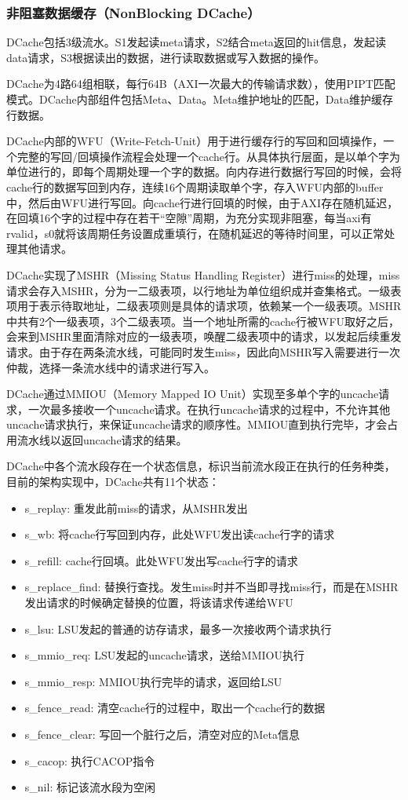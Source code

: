 \documentclass{article}
\begin{document}
\subsubsection{非阻塞数据缓存（NonBlocking DCache）}
DCache包括3级流水。S1发起读meta请求，S2结合meta返回的hit信息，发起读data请求，S3根据读出的数据，进行读取数据或写入数据的操作。\par
DCache为4路64组相联，每行64B（AXI一次最大的传输请求数），使用PIPT匹配模式。DCache内部组件包括Meta、Data。Meta维护地址的匹配，Data维护缓存行数据。\par
DCache内部的WFU（Write-Fetch-Unit）用于进行缓存行的写回和回填操作，一个完整的写回/回填操作流程会处理一个cache行。从具体执行层面，是以单个字为单位进行的，即每个周期处理一个字的数据。向内存进行数据行写回的时候，会将cache行的数据写回到内存，连续16个周期读取单个字，存入WFU内部的buffer中，然后由WFU进行写回。向cache行进行回填的时候，由于AXI存在随机延迟，在回填16个字的过程中存在若干“空隙”周期，为充分实现非阻塞，每当axi有rvalid，s0就将该周期任务设置成重填行，在随机延迟的等待时间里，可以正常处理其他请求。\par
DCache实现了MSHR（Missing Status Handling Register）进行miss的处理，miss请求会存入MSHR，分为一二级表项，以行地址为单位组织成并查集格式。一级表项用于表示待取地址，二级表项则是具体的请求项，依赖某一个一级表项。MSHR中共有2个一级表项，3个二级表项。当一个地址所需的cache行被WFU取好之后，会来到MSHR里面清除对应的一级表项，唤醒二级表项中的请求，以发起后续重发请求。由于存在两条流水线，可能同时发生miss，因此向MSHR写入需要进行一次仲裁，选择一条流水线中的请求进行写入。\par
DCache通过MMIOU（Memory Mapped IO Unit）实现至多单个字的uncache请求，一次最多接收一个uncache请求。在执行uncache请求的过程中，不允许其他uncache请求执行，来保证uncache请求的顺序性。MMIOU直到执行完毕，才会占用流水线以返回uncache请求的结果。\par
DCache中各个流水段存在一个状态信息，标识当前流水段正在执行的任务种类，目前的架构实现中，DCache共有11个状态：\par
\begin{itemize}
    \item s\_replay: 重发此前miss的请求，从MSHR发出
    \item s\_wb: 将cache行写回到内存，此处WFU发出读cache行字的请求
    \item s\_refill: cache行回填。此处WFU发出写cache行字的请求
    \item s\_replace\_find: 替换行查找。发生miss时并不当即寻找miss行，而是在MSHR发出请求的时候确定替换的位置，将该请求传递给WFU
    \item s\_lsu: LSU发起的普通的访存请求，最多一次接收两个请求执行
    \item s\_mmio\_req: LSU发起的uncache请求，送给MMIOU执行
    \item s\_mmio\_resp: MMIOU执行完毕的请求，返回给LSU
    \item s\_fence\_read: 清空cache行的过程中，取出一个cache行的数据
    \item s\_fence\_clear: 写回一个脏行之后，清空对应的Meta信息
    \item s\_cacop: 执行CACOP指令
    \item s\_nil: 标记该流水段为空闲
\end{itemize}
\end{document}
